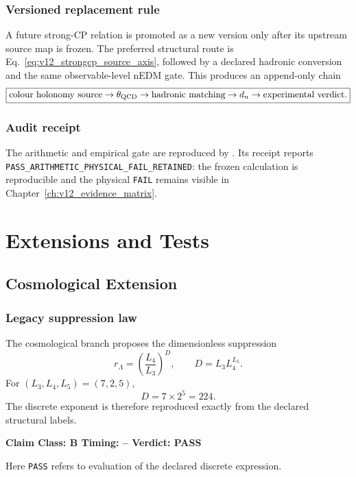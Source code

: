 \documentclass[11pt,a4paper,twoside]{book}
\theoremstyle{definition}
\newcommand{\vTwelveStatus}[3]{\par\noindent\textbf{Claim Class: #1 \quad Timing: #2 \quad Verdict: #3}\par}
\begin{document}
\section{Versioned replacement rule}

A future strong-CP relation is promoted as a new version only after its upstream source map is frozen. The preferred structural route is Eq.~\eqref{eq:v12_strongcp_source_axis}, followed by a declared hadronic conversion and the same observable-level nEDM gate. This produces an append-only chain
\[
\boxed{
\text{colour holonomy source}
\to\theta_{\rm QCD}
\to\text{hadronic matching}
\to d_n
\to\text{experimental verdict}.
}
\]

\section{Audit receipt}

The arithmetic and empirical gate are reproduced by
.
Its receipt
reports \texttt{PASS\_ARITHMETIC\_PHYSICAL\_FAIL\_RETAINED}: the frozen calculation is reproducible and the physical \texttt{FAIL} remains visible in Chapter~\ref{ch:v12_evidence_matrix}.

\clearpage







\part{Extensions and Tests}

\chapter{Cosmological Extension}
\label{ch:v12_cosmology}

\section{Legacy suppression law}

The cosmological branch proposes the dimensionless suppression
\begin{equation}
\boxed{
r_\Lambda
=\left(\frac{L_4}{L_3}\right)^D,
\qquad
D=L_3L_4^{L_5}.
}
\label{eq:v12_cosmo_suppression}
\end{equation}
For $(L_3,L_4,L_5)=(7,2,5)$,
\begin{equation}
D=7\times2^5=224.
\end{equation}
The discrete exponent is therefore reproduced exactly from the declared structural labels.
\vTwelveStatus{B}{--}{PASS}
Here \texttt{PASS} refers to evaluation of the declared discrete expression.
\end{document}
